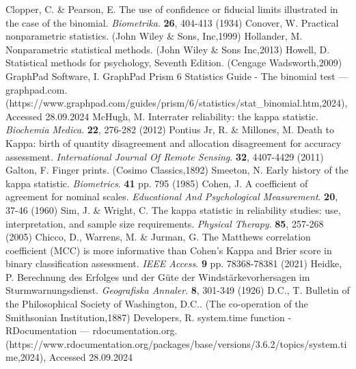 \documentclass[sn-mathphys-num]{sn-jnl}%
\begin{document}
\begin{thebibliography}{000}
Clopper, C. \& Pearson, E. The use of confidence or fiducial limits illustrated in the case of the binomial. {\em Biometrika}. \textbf{26}, 404-413 (1934)
Conover, W. Practical nonparametric statistics. (John Wiley & Sons, Inc,1999)
Hollander, M. Nonparametric statistical methods. (John Wiley & Sons Inc,2013)
Howell, D. Statistical methods for psychology, Seventh Edition. (Cengage Wadsworth,2009)
GraphPad Software, I. GraphPad Prism 6 Statistics Guide - The binomial test — graphpad.com. (https://www.graphpad.com/guides/prism/6/statistics/stat_binomial.htm,2024), Accessed 28.09.2024
McHugh, M. Interrater reliability: the kappa statistic. {\em Biochemia Medica}. \textbf{22}, 276-282 (2012)
Pontius Jr, R. \& Millones, M. Death to Kappa: birth of quantity disagreement and allocation disagreement for accuracy assessment. {\em International Journal Of Remote Sensing}. \textbf{32}, 4407-4429 (2011)
Galton, F. Finger prints. (Cosimo Classics,1892)
Smeeton, N. Early history of the kappa statistic. {\em Biometrics}. \textbf{41} pp. 795 (1985)
Cohen, J. A coefficient of agreement for nominal scales. {\em Educational And Psychological Measurement}. \textbf{20}, 37-46 (1960)
Sim, J. \& Wright, C. The kappa statistic in reliability studies: use, interpretation, and sample size requirements. {\em Physical Therapy}. \textbf{85}, 257-268 (2005)
Chicco, D., Warrens, M. \& Jurman, G. The Matthews correlation coefficient (MCC) is more informative than Cohen's Kappa and Brier score in binary classification assessment. {\em IEEE Access}. \textbf{9} pp. 78368-78381 (2021)
Heidke, P. Berechnung des Erfolges und der Güte der Windstärkevorhersagen im Sturmwarnungsdienst. {\em Geografiska Annaler}. \textbf{8}, 301-349 (1926)
D.C., T. Bulletin of the Philosophical Society of Washington, D.C.. (The co-operation of the Smithsonian Institution,1887)
Developers, R. system.time function - RDocumentation — rdocumentation.org. (https://www.rdocumentation.org/packages/base/versions/3.6.2/topics/system.time,2024), Accessed 28.09.2024

\end{thebibliography}
\end{document}

